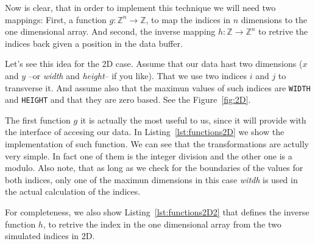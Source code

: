 Now is clear, that in order to implement this technique we will need two mappings:
First, a function $g:\mathbb{Z}^n \rightarrow \mathbb{Z}$, to map the indices in $n$ dimensions to the one dimensional array.
And second, the inverse mapping $h:\mathbb{Z} \rightarrow \mathbb{Z}^n$ to retrive the indices back given a position in the data buffer.

Let's see this idea for the 2D case.
Assume that our data hast two dimensions ($x$ and $y$ --or \emph{width} and \emph{height}-- if you like).
That we use two indices $i$ and $j$ to transverse it.
And assume also that the maximun values of such indices are \texttt{WIDTH} and \texttt{HEIGHT} and that they are zero based.
See the Figure~\ref{fig:2D}.

The first function $g$ it is actually the most useful to us, since it will provide with the interface of accesing our data. 
In Listing~\ref{lst:functions2D} we show the implementation of such function.
We can see that the transformations are actully very simple.
In fact one of them is the integer division and the other one is a modulo.
Also note, that as long as we check for the boundaries of the values for both indices, only one of the maximun dimensions in this case \emph{witdh} is used in the actual calculation of the indices.

{\centering
\begin{minipage}{\linewidth}
\end{minipage}
\par
}
\vspace{0.5cm}

For completeness, we also show Listing~\ref{lst:functions2D2} that defines the inverse function $h$, to retrive the index in the one dimensional array from the two simulated indices in 2D.

{\centering
\begin{minipage}{\linewidth}
\end{minipage}
\par
}
\vspace{0.5cm}

